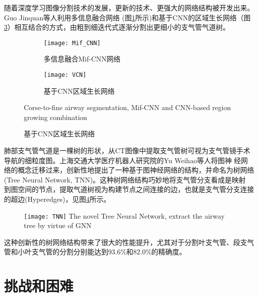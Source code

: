 	 随着深度学习图像分割技术的发展，更新的技术、更强大的网络结构被开发出来。Guo Jinquan等人\cite{Guo2021CoarsetofineAS}利用多信息融合网络
	 (图\ref{fig:MifCNN}所示)和基于CNN的区域生长网络（图\ref{fig:VCN}）相互结合的方式，由粗到细迭代式逐渐分割出更细小的支气管气道树。
	 \begin{figure}[t]
	 	\centering
	 	
	 	\begin{subfigure}{0.70\textwidth}
	 		\centering
	 		\texttt{[image: Mif\_CNN]}
	 		\caption{多信息融合Mif-CNN网络}
	 		\label{fig:MifCNN}
	 	\end{subfigure}
	 	\hfill	 	
	 	\begin{subfigure}{0.29\textwidth}
	 		\centering
	 		\texttt{[image: VCN]}
	 		\caption{基于CNN区域生长网络}
	 		\label{fig:VCN}
	 	\end{subfigure}
	 	
	 		{Corse-to-fine airway segmentation, Mif-CNN and CNN-based region growing combination}
	 \end{figure}
	 
	 肺部支气管气道是一棵树的形状，从CT图像中提取支气管树可视为支气管镜手术导航的细粒度图。上海交通大学医疗机器人研究院的Yu Weihao等人\cite{Yu2022TNN}将图神
	 经网络的概念迁移过来，创新性地提出了一种基于图神经网络的结构，并命名为树网络(Tree Neural Network, TNN\cite{Yu2022TNN})。这种树网络结构巧妙地将支气管分支看成是映射
	 到图空间的节点，提取气道树视为构建节点之间连接的边，也就是支气管分支连接的超边(Hyperedges)，见图\ref{fig:TNN}所示。
	 \begin{figure}[htpb]
	 	\centering
	 	\texttt{[image: TNN]}
	 		{The novel Tree Neural Network, extract the airway tree by virtue of GNN}
		\label{fig:TNN}
	 \end{figure}
	 
	 这种创新性的树网络结构带来了很大的性能提升，尤其对于分割叶支气管、段支气管和小叶支气管的分割分别能达到93.6\%和82.0\%\cite{Yu2022TNN}的精确度。



\section{挑战和困难}

